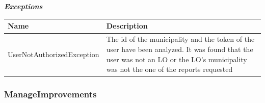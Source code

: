 							\clearpage
							\subparagraph{}
								\textit{\textbf{Exceptions}}
								\vspace{-2mm}
									\begin{table}[!h]
									\begin{tabular}{L{0.4\textwidth}L{0.4\textwidth}}
										\toprule
										\textbf{Name} & \textbf{Description} \\
										\midrule
								  	UserNotAuthorizedException & The id of the municipality and the token of the user have been analyzed. It was found that the user was not an LO or the LO's  municipality was not the one of the reports requested  \\
								 		\bottomrule
									\end{tabular}
								\end{table}

				\subsubsection{ManageImprovements}
